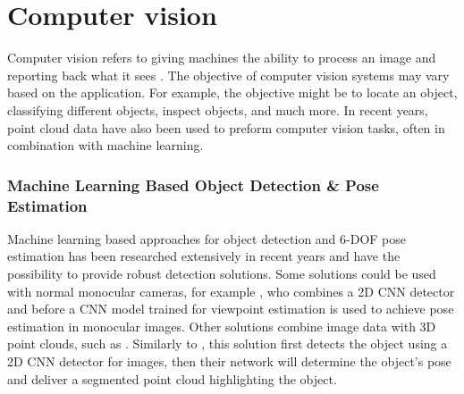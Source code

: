 

\section{Computer vision} \label{sec:T:MachineVision}
Computer vision refers to giving machines the ability to process an image and reporting back what it sees \cite{SnyderWesleyE.2010Mv}. The objective of computer vision systems may vary based on the application. For example, the objective might be to locate an object, classifying different objects, inspect objects, and much more. In recent years, point cloud data have also been used to preform computer vision tasks, often in combination with machine learning.

\subsubsection{Machine Learning Based Object Detection \& Pose Estimation} \label{sec:T:MV:CNN-based}
Machine learning based approaches for object detection and 6-DOF pose estimation has been researched extensively in recent years and have the possibility to provide robust detection solutions. Some solutions could be used with normal monocular cameras, for example \cite{JosipKerzel2018}, who combines a 2D CNN detector and before a CNN model trained for viewpoint estimation is used to achieve pose estimation in monocular images. Other solutions combine image data with 3D point clouds, such as \cite{WeiDuan2020}. Similarly to \cite{JosipKerzel2018}, this solution first detects the object using a 2D CNN detector for images, then their network will determine the object's pose and deliver a segmented point cloud highlighting the object.

